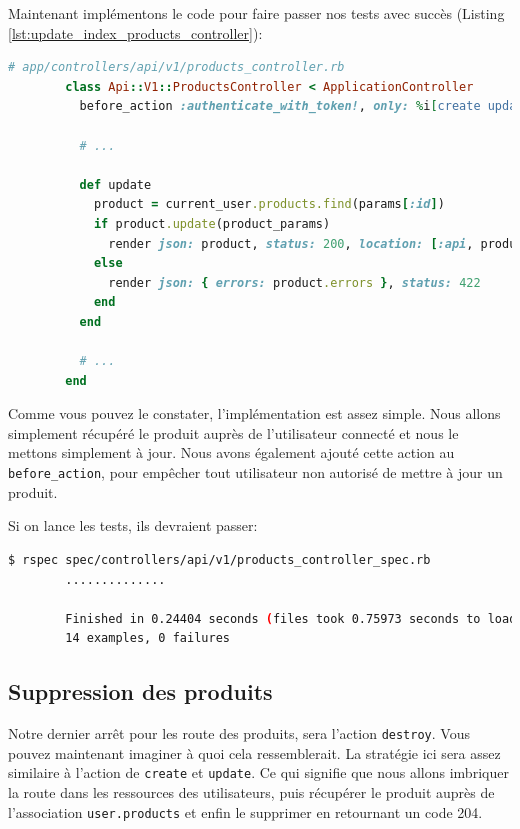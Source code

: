 \documentclass[]{report}
\begin{document}
      Maintenant implémentons le code pour faire passer nos tests avec succès (Listing \ref{lst:update_index_products_controller}):

      \begin{scriptsize}
        \begin{lstlisting}[language=ruby, caption={Implémentation de la mise à jour des produits}, label={lst:update_index_products_controller}]
        # app/controllers/api/v1/products_controller.rb
        class Api::V1::ProductsController < ApplicationController
          before_action :authenticate_with_token!, only: %i[create update]

          # ...

          def update
            product = current_user.products.find(params[:id])
            if product.update(product_params)
              render json: product, status: 200, location: [:api, product]
            else
              render json: { errors: product.errors }, status: 422
            end
          end

          # ...
        end
        \end{lstlisting}
      \end{scriptsize}

      Comme vous pouvez le constater, l'implémentation est assez simple. Nous allons simplement récupéré le produit auprès de l'utilisateur connecté et nous le mettons simplement à jour. Nous avons également ajouté cette action au \verb|before_action|, pour empêcher tout utilisateur non autorisé de mettre à jour un produit.

      Si on lance les tests, ils devraient passer:

      \begin{scriptsize}
        \begin{lstlisting}[language=bash]
        $ rspec spec/controllers/api/v1/products_controller_spec.rb
        ..............

        Finished in 0.24404 seconds (files took 0.75973 seconds to load)
        14 examples, 0 failures
        \end{lstlisting}
      \end{scriptsize}

    \subsection{Suppression des produits}

      Notre dernier arrêt pour les route des produits, sera l'action \verb|destroy|. Vous pouvez maintenant imaginer à quoi cela ressemblerait. La stratégie ici sera assez similaire à l'action de \verb|create| et \verb|update|. Ce qui signifie que nous allons imbriquer la route dans les ressources des utilisateurs, puis récupérer le produit auprès de l'association \verb|user.products| et enfin le supprimer en retournant un code 204.
\end{document}
